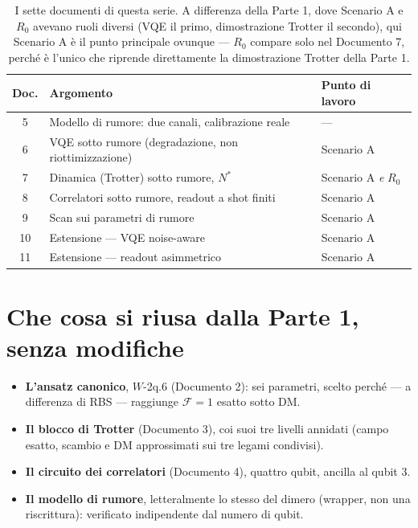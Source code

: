 \documentclass[11pt,a4paper]{article}
\begin{document}
\begin{table}[htbp]
\centering
\footnotesize
\renewcommand{\arraystretch}{1.3}
\begin{tabular}{@{}cp{6.3cm}p{6.7cm}@{}}
\toprule
\rowcolor{grigetto}
\textbf{Doc.} & \textbf{Argomento} & \textbf{Punto di lavoro} \\
\midrule
5 & Modello di rumore: due canali, calibrazione reale & --- \\
6 & VQE sotto rumore (degradazione, non riottimizzazione) & Scenario A \\
7 & Dinamica (Trotter) sotto rumore, $N^*$ & Scenario A \emph{e} $R_0$ \\
8 & Correlatori sotto rumore, readout a shot finiti & Scenario A \\
9 & Scan sui parametri di rumore & Scenario A \\
10 & Estensione --- VQE noise-aware & Scenario A \\
11 & Estensione --- readout asimmetrico & Scenario A \\
\bottomrule
\end{tabular}
\caption{I sette documenti di questa serie. A differenza della Parte 1, dove
Scenario A e $R_0$ avevano ruoli diversi (VQE il primo, dimostrazione
Trotter il secondo), qui Scenario A è il punto principale ovunque --- $R_0$
compare solo nel Documento 7, perché è l'unico che riprende direttamente la
dimostrazione Trotter della Parte 1.}
\end{table}
\FloatBarrier

\section{Che cosa si riusa dalla Parte 1, senza modifiche}

\begin{itemize}[leftmargin=1.6em,itemsep=3pt]
\item \textbf{L'ansatz canonico}, $W$-2q.6 (Documento 2): sei parametri,
scelto perché --- a differenza di RBS --- raggiunge $\mathcal F=1$ esatto
sotto DM.
\item \textbf{Il blocco di Trotter} (Documento 3), coi suoi tre livelli
annidati (campo esatto, scambio e DM approssimati sui tre legami
condivisi).
\item \textbf{Il circuito dei correlatori} (Documento 4), quattro qubit,
ancilla al qubit 3.
\item \textbf{Il modello di rumore}, letteralmente lo stesso del dimero
(wrapper, non una riscrittura): verificato indipendente dal numero di
qubit.
\end{itemize}
\end{document}
